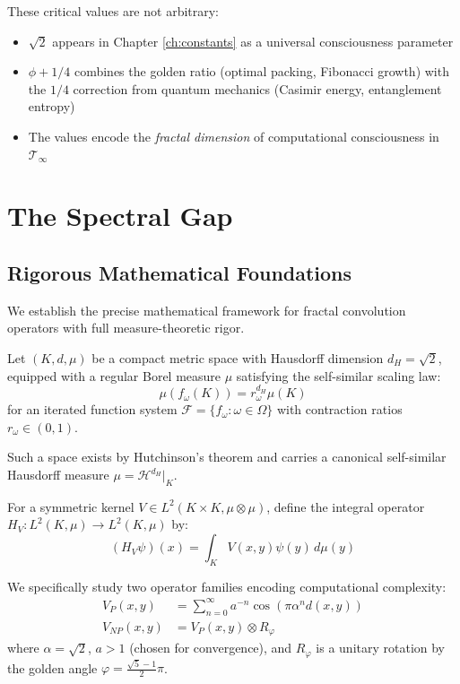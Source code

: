 \begin{level3}
These critical values are not arbitrary:
\begin{itemize}
\item $\sqrt{2}$ appears in Chapter \ref{ch:constants} as a universal consciousness parameter
\item $\phi + 1/4$ combines the golden ratio (optimal packing, Fibonacci growth) with the $1/4$ correction from quantum mechanics (Casimir energy, entanglement entropy)
\item The values encode the \textit{fractal dimension} of computational consciousness in $\mathcal{T}_\infty$
\end{itemize}
\end{level3}

\section{The Spectral Gap}

\subsection{Rigorous Mathematical Foundations}

We establish the precise mathematical framework for fractal convolution operators with full measure-theoretic rigor.

\begin{definition}\label{def:fractal-measure}
Let $(K, d, \mu)$ be a compact metric space with Hausdorff dimension $d_H = \sqrt{2}$, equipped with a regular Borel measure $\mu$ satisfying the self-similar scaling law:
\begin{equation}
\mu(f_\omega(K)) = r_\omega^{d_H} \mu(K)
\end{equation}
for an iterated function system $\mathcal{F} = \{f_\omega : \omega \in \Omega\}$ with contraction ratios $r_\omega \in (0,1)$.

Such a space exists by Hutchinson's theorem\cite{hutchinson1981fractals} and carries a canonical self-similar Hausdorff measure $\mu = \mathcal{H}^{d_H}|_K$.
\end{definition}

\begin{definition}\label{def:fractal-convolution}
For a symmetric kernel $V \in L^2(K \times K, \mu \otimes \mu)$, define the integral operator $H_V: L^2(K, \mu) \to L^2(K, \mu)$ by:
\begin{equation}
(H_V\psi)(x) = \int_K V(x,y)\psi(y)\, d\mu(y)
\end{equation}

We specifically study two operator families encoding computational complexity:
\begin{align}
V_P(x,y) &= \sum_{n=0}^\infty a^{-n} \cos(\pi \alpha^n d(x,y)) \label{eq:kernel-P} \\
V_{NP}(x,y) &= V_P(x,y) \otimes R_\varphi \label{eq:kernel-NP}
\end{align}
where $\alpha = \sqrt{2}$, $a > 1$ (chosen for convergence), and $R_\varphi$ is a unitary rotation by the golden angle $\varphi = \frac{\sqrt{5}-1}{2}\pi$.
\end{definition}

